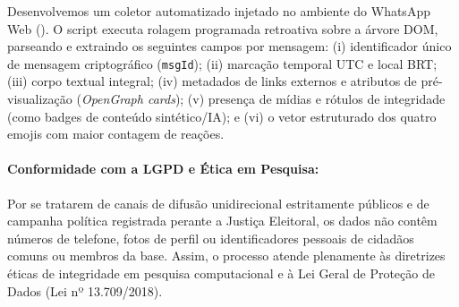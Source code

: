 \documentclass[12pt]{article}
\begin{document}
Desenvolvemos um coletor automatizado injetado no ambiente do WhatsApp Web (). O script executa rolagem programada retroativa sobre a árvore DOM, parseando e extraindo os seguintes campos por mensagem: (i) identificador único de mensagem criptográfico (\texttt{msgId}); (ii) marcação temporal UTC e local BRT; (iii) corpo textual integral; (iv) metadados de links externos e atributos de pré-visualização (\textit{OpenGraph cards}); (v) presença de mídias e rótulos de integridade (como badges de conteúdo sintético/IA); e (vi) o vetor estruturado dos quatro emojis com maior contagem de reações.

\paragraph{Conformidade com a LGPD e Ética em Pesquisa:}
Por se tratarem de canais de difusão unidirecional estritamente públicos e de campanha política registrada perante a Justiça Eleitoral, os dados não contêm números de telefone, fotos de perfil ou identificadores pessoais de cidadãos comuns ou membros da base. Assim, o processo atende plenamente às diretrizes éticas de integridade em pesquisa computacional e à Lei Geral de Proteção de Dados (Lei nº 13.709/2018).
\end{document}
